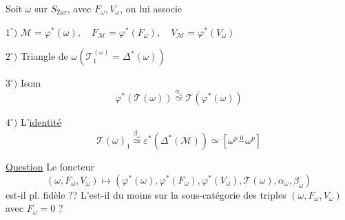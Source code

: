 Soit $\omega$ sur $S_{\mathrm{Zar}}$, avec $F_\omega,V_\omega$, on lui associe

$1^\circ)$ $\mathcal M=\varphi^*(\omega),\quad F_{\mathcal M}=\varphi^*(F_\omega),\quad V_{\mathcal M}=\varphi^*(V_\omega)$

$2^\circ)$ Triangle
 de $\omega$\quad $(\mathcal T_1^{(\omega)}=\Delta^*(\omega))$

$3^\circ)$ Isom 
\[\varphi^*(\mathcal T(\omega))\overset{\alpha_\omega}\simeq\mathcal T(\varphi^*(\omega))\]

$4^\circ)$ L'\uline{identité}
\[\mathcal T(\omega)_1\overset{\beta_\omega}\simeq\varepsilon^*(\Delta^*(\mathcal M))\simeq[\omega^p\overset0{\mathbin{-}}\omega^p]\]

\uline{Question} Le foncteur
\[
(\omega,F_\omega,V_\omega)\longmapsto(\varphi^*(\omega),\varphi^*(F_\omega),\varphi^*(V_\omega),\mathcal T(\omega),\alpha_\omega,\beta_\omega)
\]
est-il pl. fidèle ?? L'est-il du moins sur la sous-catégorie des triples $(\omega,F_\omega,V_\omega)$ avec $F_\omega=0$ ?

